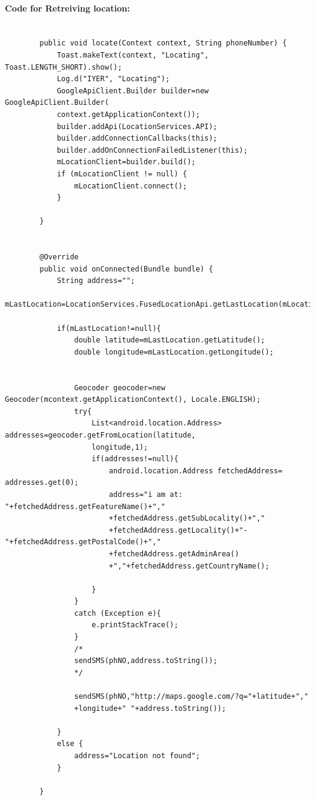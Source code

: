 		\hspace{0.9cm}\paragraph{Code for Retreiving location:}\cite{citation-6}
		\begin{verbatim}
		
		public void locate(Context context, String phoneNumber) {
			Toast.makeText(context, "Locating", Toast.LENGTH_SHORT).show();
			Log.d("IYER", "Locating");
			GoogleApiClient.Builder builder=new GoogleApiClient.Builder(
			context.getApplicationContext());
			builder.addApi(LocationServices.API);
			builder.addConnectionCallbacks(this);
			builder.addOnConnectionFailedListener(this);
			mLocationClient=builder.build();
			if (mLocationClient != null) {
				mLocationClient.connect();
			}
			
		}
		
		
		@Override
		public void onConnected(Bundle bundle) {
			String address="";
			mLastLocation=LocationServices.FusedLocationApi.getLastLocation(mLocationClient);
			
			if(mLastLocation!=null){
				double latitude=mLastLocation.getLatitude();
				double longitude=mLastLocation.getLongitude();
				
				
				Geocoder geocoder=new Geocoder(mcontext.getApplicationContext(), Locale.ENGLISH);
				try{
					List<android.location.Address> addresses=geocoder.getFromLocation(latitude,
					longitude,1);
					if(addresses!=null){
						android.location.Address fetchedAddress= addresses.get(0);
						address="i am at: "+fetchedAddress.getFeatureName()+","
						+fetchedAddress.getSubLocality()+","
						+fetchedAddress.getLocality()+"-"+fetchedAddress.getPostalCode()+","
						+fetchedAddress.getAdminArea()
						+","+fetchedAddress.getCountryName();
						
					}
				}
				catch (Exception e){
					e.printStackTrace();
				}
				/*
				sendSMS(phNO,address.toString());
				*/
				
				sendSMS(phNO,"http://maps.google.com/?q="+latitude+","
				+longitude+" "+address.toString());
				
			}
			else {
				address="Location not found";
			}
			
		}
		\end{verbatim}
		\newpage
